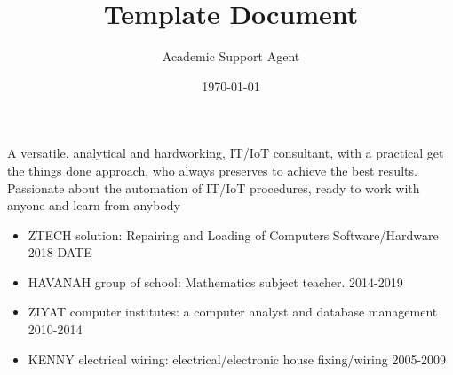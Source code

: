 \documentclass{article}
\title{Template Document}
\author{Academic Support Agent}
\date{\today}
\begin{document}
\maketitle


\begin{fullwidth}
\makecvheader
\end{fullwidth}


A versatile, analytical and hardworking, IT/IoT consultant, with a practical  get the things done   approach, who always preserves to achieve the best results. Passionate about the automation of IT/IoT procedures, ready to work with anyone and learn from anybody


\begin{itemize}
\item ZTECH solution: Repairing and Loading of Computers Software/Hardware	2018-DATE

\divider
\item HAVANAH group of school: Mathematics subject teacher.			2014-2019

\divider
\item  ZIYAT computer institutes: a computer analyst and database management	2010-2014

\divider
\item  KENNY electrical wiring: electrical/electronic house fixing/wiring			2005-2009
\end{itemize}
\end{document}

